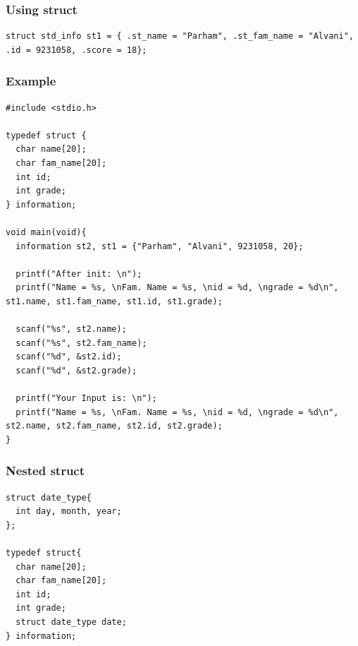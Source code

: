 \documentclass{../c-lecture}
\begin{document}
\begin{frame}[fragile]
  \frametitle{Using struct}
  \begin{verbatim}
struct std_info st1 = { .st_name = "Parham", .st_fam_name = "Alvani", .id = 9231058, .score = 18};
  \end{verbatim}
\end{frame}

\begin{frame}[fragile]
  \frametitle{Example}
  \begin{verbatim}
#include <stdio.h>

typedef struct {
  char name[20];
  char fam_name[20];
  int id;
  int grade;
} information;

void main(void){
  information st2, st1 = {"Parham", "Alvani", 9231058, 20};

  printf("After init: \n");
  printf("Name = %s, \nFam. Name = %s, \nid = %d, \ngrade = %d\n", st1.name, st1.fam_name, st1.id, st1.grade);

  scanf("%s", st2.name);
  scanf("%s", st2.fam_name);
  scanf("%d", &st2.id);
  scanf("%d", &st2.grade);

  printf("Your Input is: \n");
  printf("Name = %s, \nFam. Name = %s, \nid = %d, \ngrade = %d\n", st2.name, st2.fam_name, st2.id, st2.grade);
}
  \end{verbatim}
\end{frame}

\begin{frame}[fragile]
  \frametitle{Nested struct}
  \begin{verbatim}
struct date_type{
  int day, month, year;
};

typedef struct{
  char name[20];
  char fam_name[20];
  int id;
  int grade;
  struct date_type date;
} information;
  \end{verbatim}
\end{frame}
\end{document}
